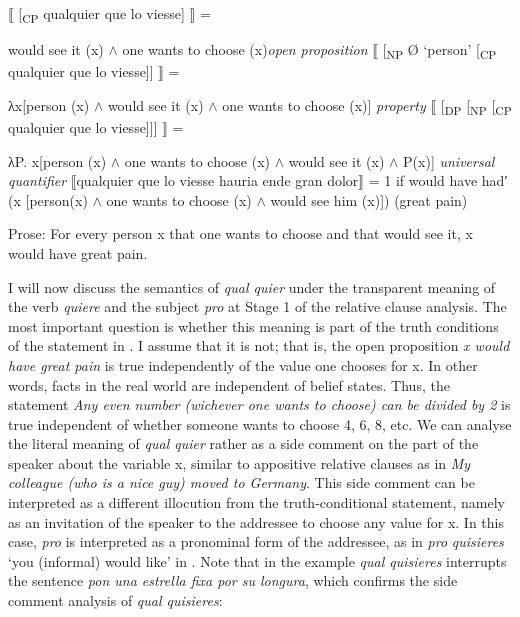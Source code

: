 \ea \label{ex:key:311} %
\ea{} \label{ex:key:311-1}   ⟦ [\textsubscript{CP} qualquier que lo viesse] ⟧ =

    would see it (x) ${\wedge}$ one wants to choose (x)\hfill\textit{open proposition}
\ex{} \label{ex:key:311-2}  ⟦ [\textsubscript{NP} Ø ‘person’ [\textsubscript{CP} qualquier que lo viesse]] ⟧ =

    λx[person (x) ${\wedge}$ would see it (x) ${\wedge}$ one wants to choose (x)] \hfill \textit{property}
\ex{} \label{ex:key:311-3}  ⟦ [\textsubscript{DP} [\textsubscript{NP} [\textsubscript{CP} qualquier que lo viesse]]] ⟧ =

    λP. \forall x[person (x) ${\wedge}$ one wants to choose (x) ${\wedge}$ would see it (x) ${\wedge}$ P(x)] \hfill  \textit{universal quantifier}
\ex{} \label{ex:key:311-4} ⟦qualquier que lo viesse hauria ende gran dolor⟧ = 1 if would have had′ (\forall x [person(x) ${\wedge}$ one wants to choose (x) ${\wedge}$ would see him (x)]) (great pain)

    Prose: For every person x that one wants to choose and that would see it, x would have great pain.
\z
\z

I will now discuss the semantics of \textit{qual quier} under the transparent meaning of the verb \textit{quiere} and the subject \textit{pro} at Stage 1 of the relative clause analysis. The most important question is whether this meaning is part of the truth conditions of the statement in . I assume that it is not; that is, the open proposition \textit{x would have great pain} is true independently of the value one chooses for {x}. In other words, facts in the real world are independent of belief states. Thus, the statement \textit{Any even number (wichever one wants to choose) can be divided by 2} is true independent of whether someone wants to choose 4, 6, 8, etc. We can analyse the literal meaning of \textit{qual quier} rather as a side comment on the part of the speaker about the variable x, similar to appositive relative clauses as in \textit{My colleague (who is a nice guy) moved to Germany}. This side comment can be interpreted as a different illocution from the truth-conditional statement, namely as an invitation of the speaker to the addressee to choose any value for x. In this case, \textit{pro} is interpreted as a pronominal form of the addressee, as in \textit{pro} \textit{quisieres} ‘you (informal) would like’ in . Note that in the example  \textit{qual quisieres} interrupts the sentence \textit{pon una estrella fixa por su longura}, which confirms the side comment analysis of \textit{qual quisieres}:

